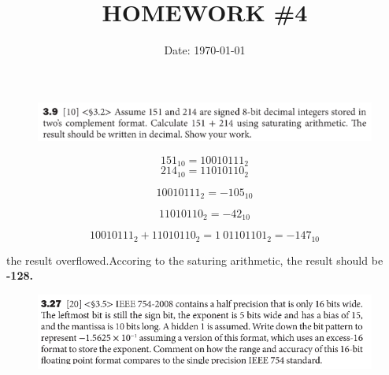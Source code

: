 \documentclass[cn,12pt]{homework}
\title{HOMEWORK \#4} %
\date{Date: \today} %
\institute{ZHEJIANG UNIVERSITY\quad COLLEGE OF INFORMATION SCIENCE AND ELECTRONICS ENGINEERING} %
\begin{document}
\maketitle



\begin{problem}
\begin{figure}[h!]
  \centering
  \includegraphics[width=1\textwidth]{./figures/image1.png}
  \label{fig:pro1}
\end{figure}

\end{problem}




\begin{solution}
  \quad
 \[
151_{10} = 10010111_2
\]
\[
214_{10} = 11010110_2
\]

 \[
  10010111_2= -105_{10}
\]

\[
  11010110_2= -42_{10}
\]

\[
  10010111_2 + 11010110_2 = 1\ 01101101_2= -147_{10}
\]

the result overflowed.Accoring to the saturing arithmetic, the result should be \textbf{\large-128.}

\end{solution}
\newpage
\begin{problem}
  \quad
  \begin{figure}[H]
    \centering
    \includegraphics[width=1\textwidth]{./figures/image2.png}
    \label{fig:pro1}
  \end{figure}



\end{problem}
\end{document}
